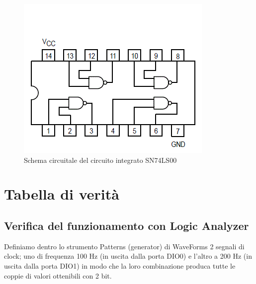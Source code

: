 \documentclass[10pt, a4paper, italian]{article}
\begin{document}
\begin{figure}[htbp]
\centering
    \includegraphics[width=\textwidth]{NAND}
    \caption{Schema circuitale del circuito integrato SN74LS00}
    \label{fig: NAND}
\end{figure}

\section{Tabella di verità}

\subsection{Verifica del funzionamento con Logic Analyzer}
Definiamo dentro lo strumento Patterns (generator) di WaveForms 2 segnali
di clock; uno di frequenza 100 Hz (in uscita dalla porta DIO0) e l'altro a
200 Hz (in uscita dalla porta DIO1) in modo che la loro combinazione produca
tutte le coppie di valori ottenibili con 2 bit.
\end{document}
